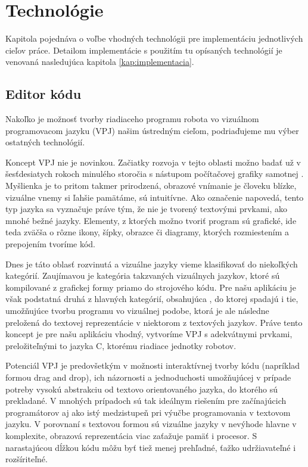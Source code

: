 \chapter{Technológie}
\label{kap:technologie}

Kapitola pojednáva o voľbe vhodných technológii pre implementáciu jednotlivých cieľov práce. Detailom implementácie s použitím tu opísaných technológií je venovaná nasledujúca kapitola \ref{kap:implementacia}.

\section{Editor kódu}
\label{kap:GrafickyProgramovaciJayzk}
Nakoľko je možnosť tvorby riadiaceho programu robota vo vizuálnom programovacom jazyku (VPJ) našim ústredným cieľom, podriaďujeme mu výber ostatných technológií.

Koncept VPJ nie je novinkou. Začiatky rozvoja v tejto oblasti možno badať už v šesťdesiatych rokoch minulého storočia s nástupom počítačovej grafiky samotnej \cite{boshernitsan2004visual}. Myšlienka je to pritom takmer prirodzená, obrazové vnímanie je človeku blízke, vizuálne vnemy si ľahšie pamätáme, sú intuitívne. Ako označenie napovedá, tento typ jazyka sa vyznačuje práve tým, že nie je tvorený textovými prvkami, ako mnohé bežné jazyky. Elementy, z ktorých možno tvoriť program sú grafické, ide teda zväčša o rôzne ikony, šípky, obrazce či diagramy, ktorých rozmiestením a prepojením tvoríme kód.

Dnes je táto oblasť rozvinutá a vizuálne jazyky vieme klasifikovať do niekoľkých kategórií. Zaujímavou je kategória takzvaných  vizuálnych jazykov, ktoré sú kompilované z grafickej formy priamo do strojového kódu. Pre našu aplikáciu je však podstatná druhá z hlavných kategórií, obsahujúca , do ktorej spadajú i tie, umožňujúce tvorbu programu vo vizuálnej podobe, ktorá je ale následne preložená do textovej reprezentácie v niektorom z textových jazykov. Práve tento koncept je pre našu aplikáciu vhodný, vytvoríme VPJ s adekvátnymi prvkami, preložiteľnými to jazyka C, ktorému  riadiace jednotky robotov.

Potenciál VPJ je predovšetkým v možnosti interaktívnej tvorby kódu (napríklad formou drag and drop), ich názornosti a jednoduchosti umožňujúcej v prípade potreby vysokú abstrakciu od textovo orientovaného jazyka, do ktorého sú prekladané. V mnohých prípadoch sú tak ideálnym riešením pre začínajúcich programátorov aj ako istý medzistupeň pri výučbe programovania v textovom jazyku. V porovnaní s textovou formou sú vizuálne jazyky v nevýhode hlavne v komplexite, obrazová reprezentácia viac zaťažuje pamäť i procesor. S narastajúcou dĺžkou kódu môžu byť tiež menej prehľadné, ťažko udržiavateľné i rozšíriteľné.

